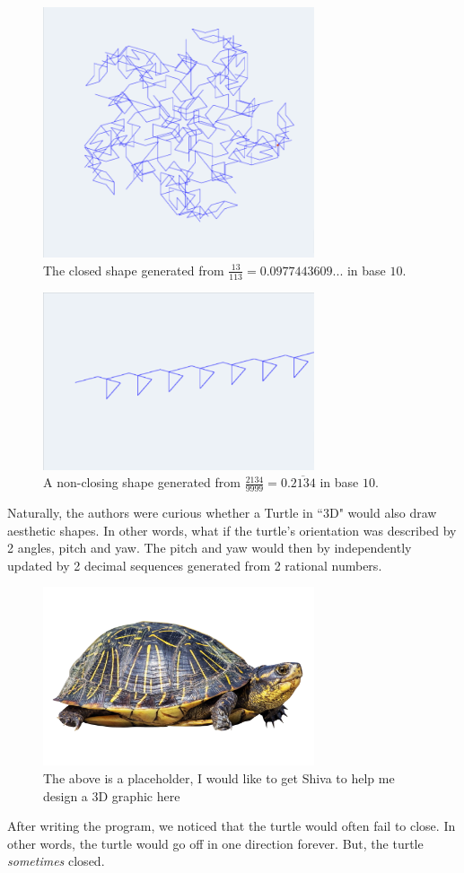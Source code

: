 \documentclass[11pt,titlepage]{article}
\begin{document}
\begin{figure}[h]
  \centering
  \includegraphics[width=8cm]{fig/Turtle1D13Div113.png}
  \caption{The closed shape generated from $\frac{13}{113} = 0.0977443609...$ in base $10$.}
\end{figure}
\begin{figure}[h]
  \centering
  \includegraphics[width=8cm]{fig/Turtle1DNotClosed.png}
  \caption{A non-closing shape generated from $\frac{2134}{9999} = 0.\overline{2134}$ in base $10$.}
\end{figure}

Naturally, the authors were curious whether a Turtle in ``3D" would also draw 
aesthetic shapes. In other words, what if the turtle's orientation was described
by 2 angles, pitch and yaw. The pitch and yaw would then by independently updated
by 2 decimal sequences generated from 2 rational numbers.
\begin{figure}[h]
  \centering
  \includegraphics[width=8cm]{fig/turtle.png}
  \caption{The above is a placeholder, I would like to get Shiva to help me design a 3D graphic here}
\end{figure}
After writing the program, we noticed that the turtle would often fail
to close. In other words, the turtle would go off in one direction forever.
But, the turtle \textit{sometimes} closed.
\end{document}
